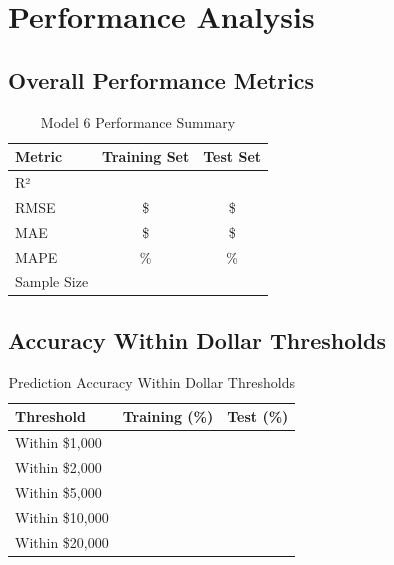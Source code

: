 \section{Performance Analysis}

\subsection{Overall Performance Metrics}

\begin{table}[h]
\centering
\caption{Model 6 Performance Summary}
\begin{tabular}{lcc}
\toprule
\textbf{Metric} & \textbf{Training Set} & \textbf{Test Set} \\
\midrule
R² & \ModelSixRSquaredTrain{} & \ModelSixRSquaredTest{} \\
RMSE & \$\ModelSixRMSETrain{} & \$\ModelSixRMSETest{} \\
MAE & \$\ModelSixMAETrain{} & \$\ModelSixMAETest{} \\
MAPE & \ModelSixMAPETrain{}\% & \ModelSixMAPETest{}\% \\
Sample Size & \ModelSixTrainingSamples{} & \ModelSixTestSamples{} \\
\bottomrule
\end{tabular}
\end{table}

\subsection{Accuracy Within Dollar Thresholds}

\begin{table}[h]
\centering
\caption{Prediction Accuracy Within Dollar Thresholds}
\begin{tabular}{lcc}
\toprule
\textbf{Threshold} & \textbf{Training (\%)} & \textbf{Test (\%)} \\
\midrule
Within \$1,000 & \ModelSixWithinOneK{} & \ModelSixWithinOneK{} \\
Within \$2,000 & \ModelSixWithinTwoK{} & \ModelSixWithinTwoK{} \\
Within \$5,000 & \ModelSixWithinFiveK{} & \ModelSixWithinFiveK{} \\
Within \$10,000 & \ModelSixWithinTenK{} & \ModelSixWithinTenK{} \\
Within \$20,000 & \ModelSixWithinTwentyK{} & \ModelSixWithinTwentyK{} \\
\bottomrule
\end{tabular}
\end{table}

